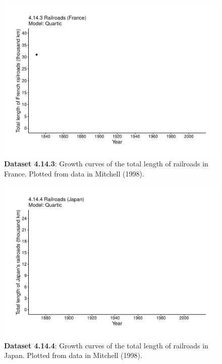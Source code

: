 \documentclass[aps,rmp,preprint,superscriptaddress,10pt,onecolumn]{article}
\begin{document}
\clearpage
\begin{figure}[h]
\includegraphics[width=\textwidth]{output/figs-ggplot/4.14.3.pdf}
\caption{\textbf{Dataset 4.14.3}: Growth curves of the total length of railroads in France. Plotted from data in Mitchell (1998).}
\end{figure}
	
\clearpage
\begin{figure}[h]
\includegraphics[width=\textwidth]{output/figs-ggplot/4.14.4.pdf}
\caption{\textbf{Dataset 4.14.4}: Growth curves of the total length of railroads in Japan. Plotted from data in Mitchell (1998).}
\end{figure}
	
\end{document}
